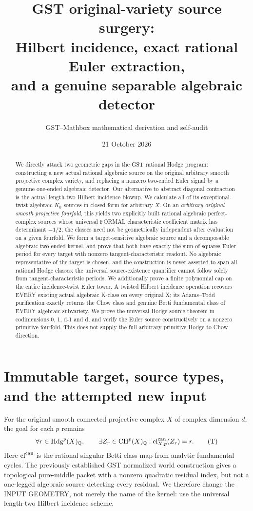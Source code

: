 \documentclass[11pt]{article}
\title{GST original-variety source surgery:\\
Hilbert incidence, exact rational Euler extraction,\\
and a genuine separable algebraic detector}
\author{GST--Mathbox mathematical derivation and self-audit}
\date{21 October 2026}
\newcommand{\Q}{\mathbb Q}
\newcommand{\CH}{\operatorname{CH}}
\newcommand{\cl}{\operatorname{cl}}
\begin{document}
\maketitle

\begin{abstract}
We directly attack two geometric gaps in the GST rational Hodge program:
constructing a new actual rational algebraic source on the original
arbitrary smooth projective complex variety, and replacing a nonzero
two-ended Euler signal by a genuine one-ended algebraic detector.
Our alternative to abstract diagonal contraction is the actual
length-two Hilbert incidence blowup. We calculate all of its
exceptional-twist algebraic \(K_0\) sources in closed form for
arbitrary \(X\). On an \emph{arbitrary original smooth projective
fourfold}, this yields two explicitly built rational algebraic
perfect-complex sources whose universal FORMAL characteristic
coefficient matrix has determinant \(-1/2\); the classes
need not be geometrically independent after evaluation on a
given fourfold. We form a target-sensitive algebraic source
and a decomposable algebraic two-ended kernel, and prove that both
have exactly the sum-of-squares Euler period for every target with
nonzero tangent-characteristic readout. No algebraic representative
of the target is chosen, and the construction is never asserted to
span all rational Hodge classes: the universal source-existence
quantifier cannot follow solely from tangent-characteristic periods.
We additionally prove a finite polynomial cap on the entire
incidence-twist Euler tower. A twisted Hilbert incidence operation
recovers EVERY existing actual algebraic K-class on every
original X; its Adams--Todd purification exactly returns
the Chow class and genuine Betti fundamental class of EVERY
algebraic subvariety. We prove the universal Hodge
source theorem in codimensions 0, 1, d-1 and d,
and verify the Euler source constructively on a nonzero
primitive fourfold. This does not supply the full arbitrary
primitive Hodge-to-Chow direction.
\end{abstract}

\section{Immutable target, source types, and the attempted new input}
For the original smooth connected projective complex \(X\) of
complex dimension \(d\), the goal for each \(p\) remains
\[
 \forall r\in \operatorname{Hdg}^{p}(X)_{\Q},\qquad
 \exists Z_r\in\CH^p(X)_{\Q}:
       \cl^{\rm can}_{X,p}(Z_r)=r.                    \tag{T}
\]
Here \(\cl^{\rm can}\) is the rational singular Betti class map from
analytic fundamental cycles. The previously established GST
normalized world construction gives a topological pure-middle
packet with a nonzero quadratic residual index, but not a
one-legged algebraic source detecting every residual. We therefore
change the INPUT GEOMETRY, not merely the name of the kernel:
use the universal length-two Hilbert incidence scheme.
\end{document}
